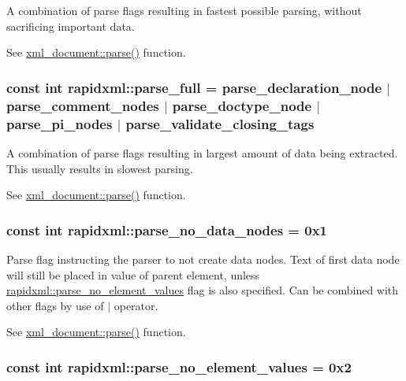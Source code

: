 \label{d7/d8a/namespacerapidxml_a64da06dfdab7c86ca954bda4fecb978f}
A combination of parse flags resulting in fastest possible parsing, without sacrificing important data. \par
\par
 See \hyperlink{classrapidxml_1_1xml__document_ad510b0c5fd8bf0180a55ffb2476e59e4}{xml\_\-document::parse()} function. \hypertarget{namespacerapidxml_abb48dc65db75d9e49734bc5bd2fabbfc}{
\subsubsection[{parse\_\-full}]{\setlength{\rightskip}{0pt plus 5cm}const int {\bf rapidxml::parse\_\-full} = {\bf parse\_\-declaration\_\-node} $|$ {\bf parse\_\-comment\_\-nodes} $|$ {\bf parse\_\-doctype\_\-node} $|$ {\bf parse\_\-pi\_\-nodes} $|$ {\bf parse\_\-validate\_\-closing\_\-tags}}}
\label{d7/d8a/namespacerapidxml_abb48dc65db75d9e49734bc5bd2fabbfc}
A combination of parse flags resulting in largest amount of data being extracted. This usually results in slowest parsing. \par
\par
 See \hyperlink{classrapidxml_1_1xml__document_ad510b0c5fd8bf0180a55ffb2476e59e4}{xml\_\-document::parse()} function. \hypertarget{namespacerapidxml_ac2d21ef14a4e8936b94aca5d38b1a74d}{
\subsubsection[{parse\_\-no\_\-data\_\-nodes}]{\setlength{\rightskip}{0pt plus 5cm}const int {\bf rapidxml::parse\_\-no\_\-data\_\-nodes} = 0x1}}
\label{d7/d8a/namespacerapidxml_ac2d21ef14a4e8936b94aca5d38b1a74d}
Parse flag instructing the parser to not create data nodes. Text of first data node will still be placed in value of parent element, unless \hyperlink{namespacerapidxml_a00e6fea134b786ea6efeed1c8bc4a668}{rapidxml::parse\_\-no\_\-element\_\-values} flag is also specified. Can be combined with other flags by use of $|$ operator. \par
\par
 See \hyperlink{classrapidxml_1_1xml__document_ad510b0c5fd8bf0180a55ffb2476e59e4}{xml\_\-document::parse()} function. \hypertarget{namespacerapidxml_a00e6fea134b786ea6efeed1c8bc4a668}{
\subsubsection[{parse\_\-no\_\-element\_\-values}]{\setlength{\rightskip}{0pt plus 5cm}const int {\bf rapidxml::parse\_\-no\_\-element\_\-values} = 0x2}}
